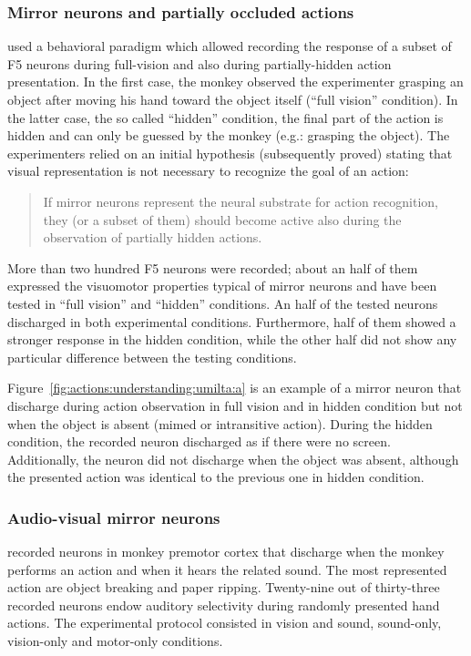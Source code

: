 \subsubsection{Mirror neurons and partially occluded actions}
\label{sec:actions:umilta}
\citet{umilta.etal:2001} used a behavioral paradigm which allowed recording the
response of a subset of F5 neurons during full-vision and also during 
partially-hidden action presentation.
In the first case, the monkey observed the experimenter grasping an object after
moving his hand toward the object itself (``full vision'' condition).
In the latter case, the so called ``hidden'' condition, the final part of the
action is hidden and can only be guessed by the monkey
(e.g.: grasping the object).
The experimenters relied on an initial hypothesis (subsequently proved)
stating that visual representation is not necessary to recognize the goal of 
an action:
\begin{quote}
If mirror neurons represent the neural substrate for action
recognition, they (or a subset of them) should become active also during the
observation of partially hidden actions.
\end{quote}
More than two hundred F5 neurons were recorded; about an half of
them expressed the visuomotor properties typical of mirror neurons and 
have been tested in ``full vision'' and ``hidden'' conditions.
An half of the tested neurons discharged in both experimental conditions.
Furthermore, half of them showed a stronger response in the hidden condition,
while the other half did not show any particular difference between the testing
conditions.


Figure~\ref{fig:actions:understanding:umilta:a} is an example of a mirror
neuron that discharge during action observation in full vision and in hidden 
condition but not when the object is absent (mimed or intransitive action). 
During the hidden condition, the recorded neuron discharged as if there were no
screen.
Additionally, the neuron did not discharge when the object was absent,
although the presented action was identical to the previous one in hidden
condition.
\subsubsection{Audio-visual mirror neurons}
\label{sec:actions:kohler}
\citet{kohler.etal:2002} recorded neurons in monkey premotor cortex that 
discharge when the monkey performs an action and when it hears the related
sound.
The most represented action are object breaking and paper ripping. 
Twenty-nine out of thirty-three recorded neurons endow auditory selectivity
during randomly presented hand actions.
The experimental protocol consisted in vision and sound, sound-only, 
vision-only and motor-only conditions.


